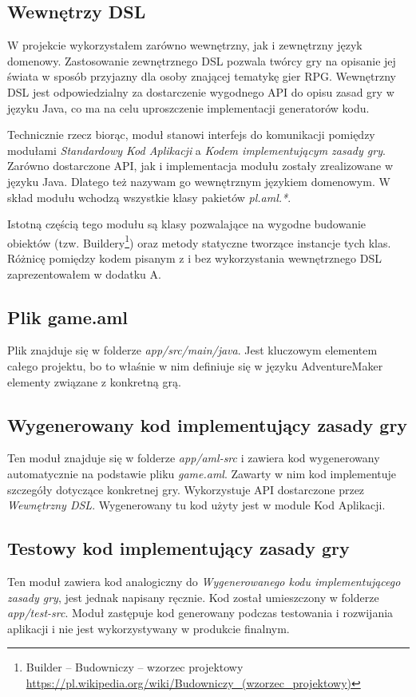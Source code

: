 \documentclass[openright]{xmgr}
\begin{document}
\subsection*{Wewnętrzy DSL}

W projekcie wykorzystałem zarówno wewnętrzny, jak i zewnętrzny język domenowy. Zastosowanie zewnętrznego DSL pozwala twórcy gry na opisanie jej świata w sposób przyjazny dla osoby znającej tematykę gier RPG.  Wewnętrzny DSL jest odpowiedzialny za dostarczenie wygodnego API do opisu zasad gry w języku Java, co ma na celu uproszczenie implementacji generatorów kodu.

Technicznie rzecz biorąc, moduł stanowi interfejs do komunikacji pomiędzy modułami \textit{Standardowy Kod Aplikacji} a \textit{Kodem implementującym zasady gry}. Zarówno dostarczone API, jak i implementacja modułu zostały zrealizowane w języku Java. Dlatego też nazywam go wewnętrznym językiem domenowym. W skład modułu wchodzą wszystkie klasy pakietów \textit{pl.aml.*}.

Istotną częścią tego modułu są klasy pozwalające na wygodne budowanie obiektów (tzw. Buildery\footnote{Builder -- Budowniczy  -- wzorzec projektowy  \url{https://pl.wikipedia.org/wiki/Budowniczy_(wzorzec_projektowy)}}) oraz metody statyczne tworzące instancje tych klas. Różnicę pomiędzy kodem pisanym z i bez wykorzystania wewnętrznego DSL zaprezentowałem w dodatku A.

\subsection*{Plik game.aml}
Plik znajduje się w folderze \textit{app/src/main/java}. Jest kluczowym elementem całego projektu, bo to właśnie w nim definiuje się w języku AdventureMaker elementy związane z konkretną grą.

\subsection*{Wygenerowany kod implementujący zasady gry}
Ten moduł znajduje się w folderze \textit{app/aml-src} i zawiera kod wygenerowany automatycznie na podstawie pliku \textit{game.aml}. Zawarty w nim kod implementuje szczegóły dotyczące konkretnej gry. Wykorzystuje API dostarczone przez \textit{Wewnętrzny DSL}. Wygenerowany tu kod użyty jest w module Kod Aplikacji.

\subsection*{Testowy kod implementujący zasady gry}
Ten moduł zawiera kod analogiczny do \textit{Wygenerowanego kodu implementującego zasady gry}, jest jednak napisany ręcznie. Kod został umieszczony w folderze \textit{app/test-src}. Moduł zastępuje kod generowany podczas testowania i rozwijania aplikacji i nie jest wykorzystywany w produkcie finalnym.
\end{document}
